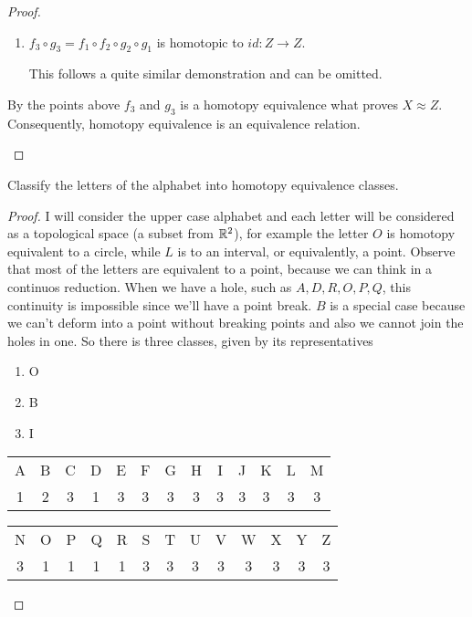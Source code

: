 \begin{proof}
\begin{enumerate}
\begin{enumerate}
        \item $f_3 \circ g_3 = f_1 \circ f_2 \circ g_2 \circ g_1$ is homotopic
        to $id: Z \to Z$.

       This follows a quite similar demonstration and can be omitted. 

    \end{enumerate} 

    By the points above $f_3$ and $g_3$ is a homotopy equivalence what proves
    $X \approx Z$.  Consequently, homotopy equivalence is an equivalence relation.
  
\end{enumerate}

\end{proof}

\noindent\linia

\begin{exercise}
    Classify the letters of the alphabet into homotopy equivalence classes.
\end{exercise}

\begin{proof}

I will consider the upper case alphabet and each letter will be considered as
a topological space (a subset from $\mathbb{R}^2$), for example the letter $O$ is
homotopy equivalent to a circle, while $L$ is to an interval, or equivalently,
a point. Observe that most of the letters are equivalent to a point, because
we can think in a continuos reduction. When we have a hole, such as $A, D, R, O,
P, Q$, this continuity is impossible since we'll have a point break. $B$ is a
special case because we can't deform into a point without breaking points and
also we cannot join the holes in one. So there is three classes, given by its
representatives

\begin{enumerate}
    \item O
    \item B
    \item I
\end{enumerate}

\begin{center}
    \begin{tabular}{c c c c c c c c c c c c c}
     A & B & C & D & E & F & G & H & I & J & K & L & M   \\ 
     1 & 2 & 3 & 1 & 3 & 3 & 3 & 3 & 3 & 3 & 3 & 3 & 3 
    \end{tabular}
    \end{center}

\begin{center}
    \begin{tabular}{c c c c c c c c c c c c c}
     N & O & P & Q & R & S & T & U & V & W & X & Y & Z  \\ 
     3 & 1 & 1 & 1 & 1 & 3 & 3 & 3 & 3 & 3 & 3 & 3 & 3     
    \end{tabular}
\end{center}
    
\end{proof}